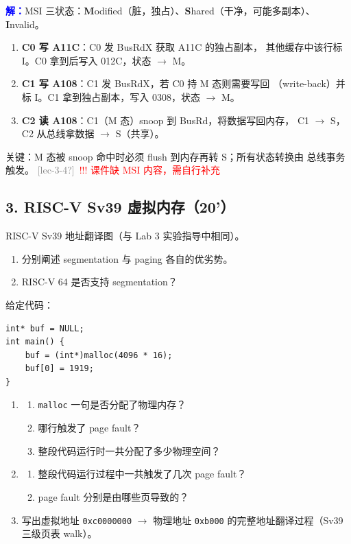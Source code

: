 \documentclass[11pt,a4paper]{article}
\newcommand{\lec}[1]{\textcolor{gray}{[lec-#1]}}
\newcommand{\ans}{\par\noindent\textcolor{blue}{\textbf{解：}}}
\begin{document}
\ans MSI 三状态：\textbf{M}odified（脏，独占）、\textbf{S}hared（干净，可能多副本）、
\textbf{I}nvalid。

\begin{enumerate}[label=(\arabic*),nosep]
  \item \textbf{C0 写 A11C}：C0 发 BusRdX 获取 A11C 的独占副本，
        其他缓存中该行标 I。C0 拿到后写入 012C，状态 $\to$ M。
  \item \textbf{C1 写 A108}：C1 发 BusRdX，若 C0 持 M 态则需要写回
        （write-back）并标 I。C1 拿到独占副本，写入 0308，状态 $\to$ M。
  \item \textbf{C2 读 A108}：C1（M 态）snoop 到 BusRd，将数据写回内存，
        C1 $\to$ S，C2 从总线拿数据 $\to$ S（共享）。
\end{enumerate}

\noindent 关键：M 态被 snoop 命中时必须 flush 到内存再转 S；所有状态转换由
总线事务触发。 \lec{3-4?}\ \textcolor{red}{\textcolor{red}{!!!} 课件缺 MSI 内容，需自行补充}

\subsection*{3. RISC-V Sv39 虚拟内存（20'）}

RISC-V Sv39 地址翻译图（与 Lab 3 实验指导中相同）。

\begin{enumerate}[label=(\arabic*),leftmargin=*]
  \item 分别阐述 segmentation 与 paging 各自的优劣势。
  \item RISC-V 64 是否支持 segmentation？
\end{enumerate}

给定代码：
\begin{verbatim}
int* buf = NULL;
int main() {
    buf = (int*)malloc(4096 * 16);
    buf[0] = 1919;
}
\end{verbatim}

\begin{enumerate}[label=(\arabic*),leftmargin=*,resume]
  \item
  \begin{enumerate}[label=(\roman*)]
    \item \texttt{malloc} 一句是否分配了物理内存？
    \item 哪行触发了 page fault？
    \item 整段代码运行时一共分配了多少物理空间？
  \end{enumerate}
  \item
  \begin{enumerate}[label=(\roman*)]
    \item 整段代码运行过程中一共触发了几次 page fault？
    \item page fault 分别是由哪些页导致的？
  \end{enumerate}
  \item 写出虚拟地址 \texttt{0xc0000000} $\to$ 物理地址 \texttt{0xb000}
        的完整地址翻译过程（Sv39 三级页表 walk）。
\end{enumerate}
\end{document}
